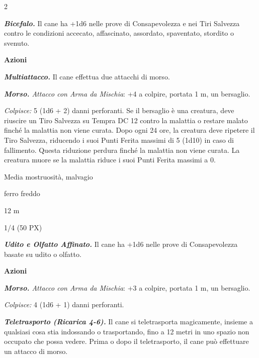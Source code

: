 \begin{multicols}{2}
{\emph{\textbf{Bicefalo.}} Il cane ha +1d6 nelle prove di Consapevolezza e nei Tiri Salvezza contro le condizioni accecato, affascinato, assordato, spaventato, stordito o svenuto.

\textbf{Azioni}

\emph{\textbf{Multiattacco.}} Il cane effettua due attacchi di morso.

\emph{\textbf{Morso.} Attacco con Arma da Mischia}: +4 a colpire, portata 1 m, un bersaglio.

\emph{Colpisce:} 5 (1d6 + 2) danni perforanti. Se il bersaglio è una creatura, deve riuscire un Tiro Salvezza su Tempra DC 12 contro la malattia o restare malato finché la malattia non viene curata. Dopo ogni 24 ore, la creatura deve ripetere il Tiro Salvezza, riducendo i suoi Punti Ferita massimi di 5 (1d10) in caso di fallimento. Questa riduzione perdura finché la malattia non viene curata. La creatura muore se la malattia riduce i suoi Punti Ferita massimi a 0.

\begin{description}[noitemsep, topsep=0pt, parsep=0pt, partopsep=0pt, itemsep=1pt, leftmargin=2.35cm,  labelwidth=2.2cm, itemindent=0cm, listparindent=0pt] %
\setlength{\baselineskip}{10pt}
\item[\textbf{Taglia/Tipo}] Media mostruosità, malvagio
\item[\textbf{Caratt.}] 
\item[\textbf{Punti Ferita}] 
\item[\textbf{Vul. al Danno}] ferro freddo
\item[\textbf{Tiri Salvez.}] 
\item[\textbf{Movimento}] 12 m
\item[\textbf{Sfida}] 1/4 (50 PX)
\end{description}
\smallskip

\emph{\textbf{Udito e Olfatto Affinato.}} Il cane ha +1d6 nelle prove di Consapevolezza basate su udito o olfatto.

\textbf{Azioni}

\emph{\textbf{Morso.} Attacco con Arma da Mischia}: +3 a colpire, portata 1 m, un bersaglio.

\emph{Colpisce:} 4 (1d6 + 1) danni perforanti.

\emph{\textbf{Teletrasporto (Ricarica 4-6).}} Il cane si teletrasporta magicamente, insieme a qualsiasi cosa stia indossando o trasportando, fino a 12 metri in uno spazio non occupato che possa vedere. Prima o dopo il teletrasporto, il cane può effettuare un attacco di morso.

}
\end{multicols}

